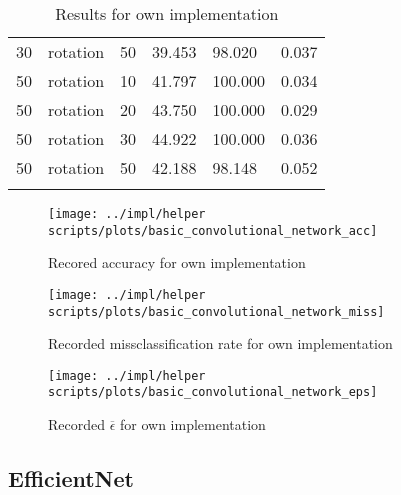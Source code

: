 \begin{longtable}{|| p{} | p{} | p{} | p{} | p{} | p{} ||}
    30                & rotation      & 50             & 39.453                    & 98.020                 & 0.037   \\
    50                & rotation      & 10             & 41.797                    & 100.000                & 0.034   \\
    50                & rotation      & 20             & 43.750                    & 100.000                & 0.029   \\
    50                & rotation      & 30             & 44.922                    & 100.000                & 0.036   \\
    50                & rotation      & 50             & 42.188                    & 98.148                 & 0.052   \\
    \caption{\label{tab:table1}Results for own implementation}
\end{longtable}

\begin{figure}[h]
    \caption{Recored accuracy for own implementation}
    \centering
    \texttt{[image: ../impl/helper scripts/plots/basic\_convolutional\_network\_acc]}
\end{figure}

\begin{figure}[h]
    \caption{Recorded missclassification rate for own implementation}
    \centering
    \texttt{[image: ../impl/helper scripts/plots/basic\_convolutional\_network\_miss]}
\end{figure}

\begin{figure}[h]
    \caption{Recorded $\overline{\epsilon}$ for own implementation}
    \centering
    \texttt{[image: ../impl/helper scripts/plots/basic\_convolutional\_network\_eps]}
\end{figure}

\subsection{EfficientNet}


